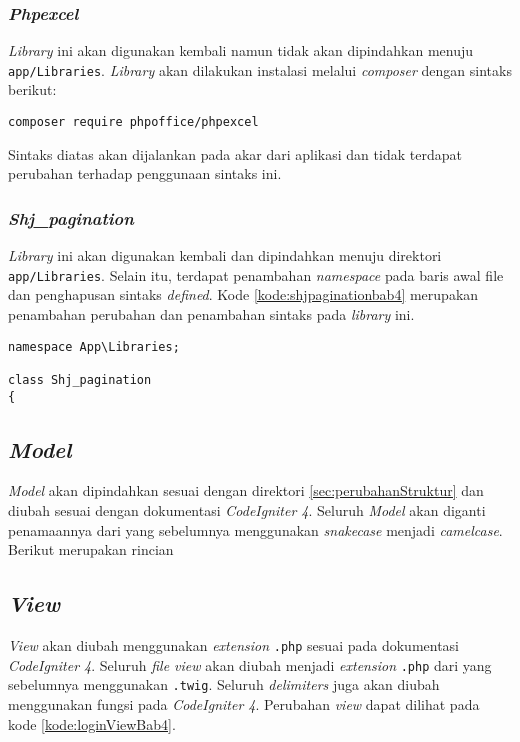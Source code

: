 \subsubsection{\textit{Phpexcel}}
\textit{Library} ini akan digunakan kembali namun tidak akan dipindahkan menuju \texttt{app/Libraries}. \textit{Library} akan dilakukan instalasi melalui \textit{composer} dengan sintaks berikut:
\begin{center}
	\verb|composer require phpoffice/phpexcel|
\end{center}
Sintaks diatas akan dijalankan pada akar dari aplikasi dan tidak terdapat perubahan terhadap penggunaan sintaks ini.

\subsubsection{\textit{Shj\_pagination}}
\textit{Library} ini akan digunakan kembali dan dipindahkan menuju direktori \texttt{app/Libraries}. Selain itu, terdapat penambahan \textit{namespace} pada baris awal file dan penghapusan sintaks \textit{defined}. Kode \ref{kode:shjpaginationbab4} merupakan penambahan perubahan dan penambahan sintaks pada \textit{library} ini.

\begin{lstlisting}[caption=Perancangan perubahan \textit{library Shj\_pagination} pada \textit{CodeIgniter 4}, label=kode:shjpaginationbab4]
namespace App\Libraries;

class Shj_pagination
{
\end{lstlisting}

\subsection{\textit{Model}}
\textit{Model} akan dipindahkan sesuai dengan direktori \ref{sec:perubahanStruktur} dan diubah sesuai dengan dokumentasi \textit{CodeIgniter 4}. Seluruh \textit{Model} akan diganti penamaannya dari yang sebelumnya menggunakan \textit{snakecase} menjadi \textit{camelcase}. Berikut merupakan rincian 

\subsection{\textit{View}}
\textit{View} akan diubah menggunakan \textit{extension} \texttt{.php} sesuai pada dokumentasi \textit{CodeIgniter 4}. Seluruh \textit{file view} akan diubah menjadi \textit{extension} \texttt{.php} dari yang sebelumnya menggunakan \texttt{.twig}. Seluruh \textit{delimiters} juga akan diubah menggunakan fungsi pada \textit{CodeIgniter 4}. Perubahan \textit{view} dapat dilihat pada kode \ref{kode:loginViewBab4}.

